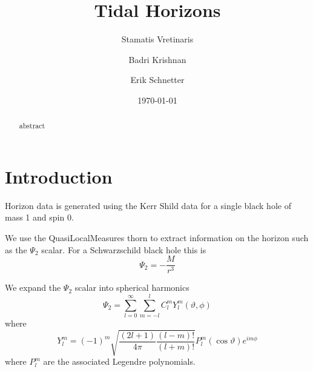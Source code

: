 \documentclass[reprint, prd, nofootinbib, superscriptaddress, floatfix]{revtex4-2}  %
\begin{document}
\title{Tidal Horizons}

\author{Stamatis Vretinaris}

\author{Badri Krishnan}

\author{Erik Schnetter}

\date{\today}

\begin{abstract}
abstract\end{abstract}

\maketitle
\section{Introduction}
Horizon data is generated using the Kerr Shild data for a single black hole of mass 1 and spin 0.

We use the QuasiLocalMeasures thorn to extract information on the horizon such as the $\Psi_{2}$ scalar.
For a Schwarzschild black hole this is
\begin{equation}
  \label{eq:psi2-schwarzschild}
  \Psi_{2} = -\frac{M}{r^{3}}
\end{equation}


We expand the $\Psi_{2}$ scalar into spherical harmonics
\begin{equation}
  \label{eq:expansion}
  \Psi_{2} = \sum_{l=0}^{\infty}\sum_{m=-l}^{l} C_{l}^{m}Y_{l}^{m}(\vartheta, \phi)
\end{equation}
where
\begin{equation}
  \label{eq:spherical-harmonics}
  Y_{l}^{m}= (-1)^{m} \sqrt{\frac{(2l+1)}{4\pi} \frac{(l-m)!}{(l+m)!}} P_{l}^{m} (\cos \vartheta) e^{im\phi}
\end{equation}
where $P_{l}^{m}$ are the associated Legendre polynomials.
\end{document}
